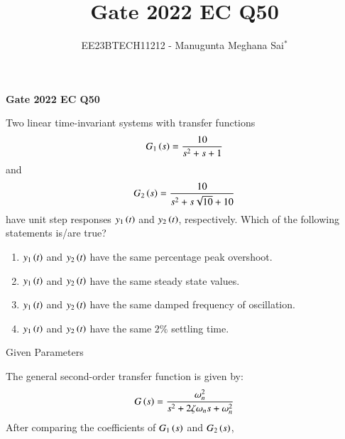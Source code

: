 \documentclass[journal,12pt,onecolumn]{IEEEtran}
\theoremstyle{remark}
\begin{document}
    
    
    \vspace{3cm}
    
    \title{Gate 2022 EC Q50}
    \author{EE23BTECH11212 - Manugunta Meghana Sai$^{*}$%
    }
    \maketitle
    \bigskip
    
    \renewcommand{\thefigure}{\theenumi}
    \renewcommand{\thetable}{\theenumi}
    
    \vspace{3cm}
    \textbf{Gate 2022 EC Q50} 
    
    Two linear time-invariant systems with transfer functions 
    \begin{align*}
    G_{1}\left(s\right) = \frac{10}{s^{2} + s + 1} 
    \end{align*}
    and
    \begin{align*}
    G_{2}\left(s\right) = \frac{10}{s^{2}+s\sqrt{10} +10}
    \end{align*}
    have unit step responses $y_{1}\left(t\right)$ and $y_{2}\left(t\right)$, respectively. Which of the following statements is/are true?
    \begin{enumerate}
    \item $y_{1}\left(t\right)$ and $y_{2}\left(t\right)$ have the same percentage peak overshoot.\\
    \item $y_{1}\left(t\right)$ and $y_{2}\left(t\right)$ have the same steady state values.\\
    \item $y_{1}\left(t\right)$ and $y_{2}\left(t\right)$ have the same damped frequency of oscillation.\\
    \item $y_{1}\left(t\right)$ and $y_{2}\left(t\right)$ have the same $2\%$ settling time.\\
    \end{enumerate}
    \solution
    \fi
    \begin{table}[h!]
 	\centering
 	\resizebox{6 cm}{!}{
 		
 	}
 	\caption{Given Parameters}
 	\label{tab:msmECgate50tab1}
     \end{table} 
    The general second-order transfer function is given by:
    \begin{align}
    G\left(s\right) = \frac{\omega_n^2}{s^2 + 2\zeta\omega_n s + \omega_n^2}
    \end{align}
    After comparing the coefficients of $G_{1}\left(s\right)$ and $G_{2}\left(s\right)$,
\end{document}
